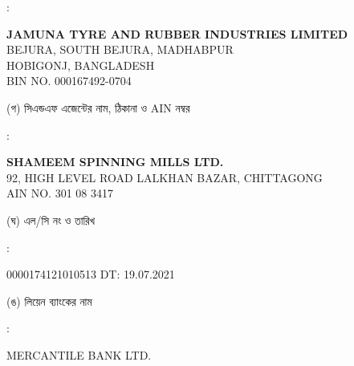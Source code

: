 \documentclass[12pt]{article}
\newcommand{\lcno}{0000174121010513}
\newcommand{\lcdt}{19.07.2021}
\newcommand{\lienbank}{MERCANTILE BANK LTD.}
\newcommand{\jtril}{JAMUNA TYRE AND RUBBER INDUSTRIES LIMITED}
\newcommand{\jtrila}{BEJURA, SOUTH BEJURA, MADHABPUR
\\
HOBIGONJ, BANGLADESH
}
\newcommand{\impn}{\jtril}
\newcommand{\impadd}{\jtrila}
\newcommand{\impbin}{000167492-0704}
\newcommand{\cnfn}{SHAMEEM SPINNING MILLS LTD.}
\newcommand{\cnfadd}{92, HIGH LEVEL ROAD
\newline
LALKHAN BAZAR, CHITTAGONG}
\newcommand{\cnfain}{301 08 3417}
\begin{document}
\begin{minipage}[t]{0.02\linewidth}
:
\end{minipage}
\begin{minipage}[t]{0.50\linewidth}
\textbf{{\impn}}
\\
{\impadd}
\\
BIN NO. {\impbin}
\\
\end{minipage}
\begin{minipage}[t]{0.05\linewidth}
\hspace*{1em}
\end{minipage}
\begin{minipage}[t]{0.45\linewidth}
(গ) সিএন্ডএফ এজেন্টের নাম, ঠিকানা
ও AIN নম্বর
\end{minipage}
\begin{minipage}[t]{0.02\linewidth}
:
\end{minipage}
\begin{minipage}[t]{0.50\linewidth}
\textbf{{\cnfn}}
\\
{\cnfadd}
\\
AIN NO. {\cnfain}
\\
\end{minipage}
\begin{minipage}[t]{0.05\linewidth}
\hspace*{1em}
\end{minipage}
\begin{minipage}[t]{0.45\linewidth}
(ঘ) এল/সি নং ও তারিখ
\end{minipage}
\begin{minipage}[t]{0.02\linewidth}
:
\end{minipage}
\begin{minipage}[t]{0.50\linewidth}
{\lcno} \hspace{2em} DT: {\lcdt}
\\
\end{minipage}
\begin{minipage}[t]{0.05\linewidth}
\hspace*{1em}
\end{minipage}
\begin{minipage}[t]{0.45\linewidth}
(ঙ) লিয়েন ব্যাংকের নাম
\end{minipage}
\begin{minipage}[t]{0.02\linewidth}
:
\end{minipage}
\begin{minipage}[t]{0.50\linewidth}
{\lienbank}
\\
\end{minipage}
\end{document}
